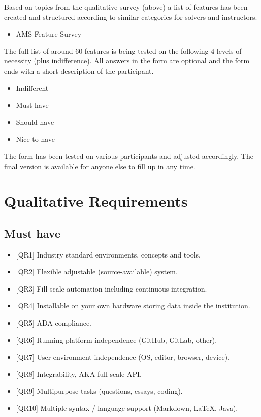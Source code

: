 {Based on topics from the qualitative survey (above) a list of features has been created and structured according to similar categories for solvers and instructors.}

\begin{itemize}
\item
  {AMS Feature Survey}
\end{itemize}

{The full list of around 60 features is being tested on the following 4 levels of necessity (plus indifference). All answers in the form are optional and the form ends with a short description of the participant.}

\begin{itemize}
\item
  {Indifferent}
\item
  {Must have}
\item
  {Should have}
\item
  {Nice to have}
\end{itemize}

{The form has been tested on various participants and adjusted accordingly. The final version is available for anyone else to fill up in any time.}

\section{Qualitative Requirements} \label{sec:qual}

\subsection{Must have} \label{ssec:qual-must}

\begin{itemize}
\item
  {{[}QR1{]} Industry standard environments, concepts and tools.}
\item
  {{[}QR2{]} }{Flexible adjustable (source-available) system.}
\item
  {{[}QR3{]} Fill-scale }{automation including continuous integration.}
\item
  {{[}QR4{]} }{Installable on your own hardware storing data inside the institution.}
\item
  {{[}QR5{]} ADA compliance.}
\item
  {{[}QR6{]} Running platform independence (GitHub, GitLab, other).}
\item
  {{[}QR7{]} User environment independence (OS, editor, browser, device).}
\item
  {{[}QR8{]} Integrability, AKA full-scale API.}
\item
  {{[}QR9{]} Multipurpose tasks (questions, essays, coding).}
\item
  {{[}QR10{]} Multiple syntax / language support (Markdown, LaTeX, Java).}
\end{itemize}

